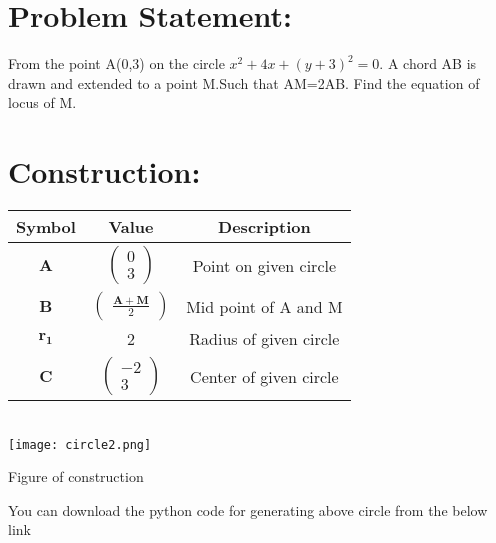 \documentclass[10pt,a4paper]{report}
\newcommand{\myvec}[1]{\ensuremath{\begin{pmatrix}#1\end{pmatrix}}}
\let\vec\mathbf
\begin{document}
\begin{multicols}{2}
\section*{Problem Statement:}
From the point A(0,3) on the circle $x^2+4x+(y+3)^2=0$. A chord AB is drawn and extended to a point M.Such that AM=2AB. Find the equation of locus of M.
\section*{Construction:}
\hspace{0.25cm}
\begin{tabular}{|c|c|c|}
	\hline
	\textbf{Symbol}&\textbf{Value}&\textbf{Description}\\
	\hline
    $\vec{A}$&$\myvec{0 \\ 3}$&Point on given circle\\
	\hline
	 $\vec{B}$ & $\myvec{\frac{
		 \vec{A}+\vec{M}}{2} }$& Mid point of A and M\\

	 \hline
	 $\vec{r_1}$ & 2 & Radius of given circle\\
	 \hline
	 $\vec{C}$ & $\myvec{-2 \\ 3}$ & Center of given circle\\
	 \hline
\end{tabular}
\vspace{0.5cm}\\
\texttt{[image: circle2.png]}
\begin{center}
Figure of construction
\end{center} 
You can download the python code for generating above circle from the below link
\vspace{0.25cm}\\

\end{multicols}
\end{document}
